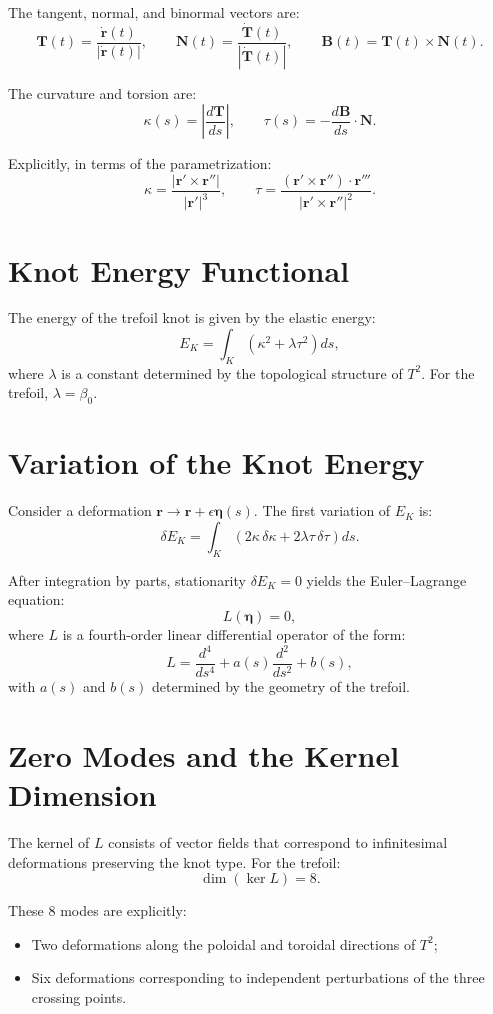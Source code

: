 \documentclass[12pt,oneside]{book}
\begin{document}
The tangent, normal, and binormal vectors are:
\[
\mathbf{T}(t) = \frac{\dot{\mathbf{r}}(t)}{|\dot{\mathbf{r}}(t)|}, \qquad
\mathbf{N}(t) = \frac{\dot{\mathbf{T}}(t)}{|\dot{\mathbf{T}}(t)|}, \qquad
\mathbf{B}(t) = \mathbf{T}(t)\times\mathbf{N}(t).
\]

The curvature and torsion are:
\[
\kappa(s) = \left|\frac{d\mathbf{T}}{ds}\right|, \qquad
\tau(s) = -\frac{d\mathbf{B}}{ds}\cdot \mathbf{N}.
\]

Explicitly, in terms of the parametrization:
\[
\kappa = \frac{|\mathbf{r}' \times \mathbf{r}''|}{|\mathbf{r}'|^3}, \qquad
\tau = \frac{(\mathbf{r}' \times \mathbf{r}'') \cdot \mathbf{r}'''}{|\mathbf{r}' \times \mathbf{r}''|^2}.
\]

\section{Knot Energy Functional}

The energy of the trefoil knot is given by the elastic energy:
\[
E_K = \int_K \left( \kappa^2 + \lambda \tau^2 \right) ds,
\]
where $\lambda$ is a constant determined by the topological structure of $T^2$. For the trefoil, $\lambda = \beta_0$.

\section{Variation of the Knot Energy}

Consider a deformation $\mathbf{r} \to \mathbf{r} + \epsilon \boldsymbol{\eta}(s)$. The first variation of $E_K$ is:
\[
\delta E_K = \int_K \left( 2\kappa \,\delta\kappa + 2\lambda \tau \,\delta\tau \right) ds.
\]

After integration by parts, stationarity $\delta E_K = 0$ yields the Euler--Lagrange equation:
\[
L(\boldsymbol{\eta}) = 0,
\]
where $L$ is a fourth-order linear differential operator of the form:
\[
L = \frac{d^4}{ds^4} + a(s)\frac{d^2}{ds^2} + b(s),
\]
with $a(s)$ and $b(s)$ determined by the geometry of the trefoil.

\section{Zero Modes and the Kernel Dimension}

The kernel of $L$ consists of vector fields that correspond to infinitesimal deformations preserving the knot type. For the trefoil:
\[
\dim(\ker L) = 8.
\]

These 8 modes are explicitly:
\begin{itemize}
    \item Two deformations along the poloidal and toroidal directions of $T^2$;
    \item Six deformations corresponding to independent perturbations of the three crossing points.
\end{itemize}
\end{document}
